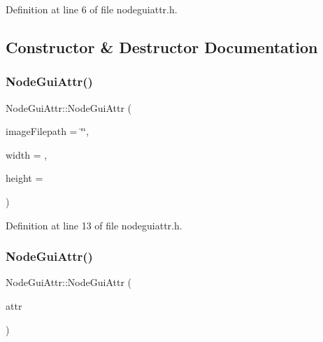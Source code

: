 Definition at line 6 of file nodeguiattr.\+h.



\subsection{Constructor \& Destructor Documentation}
\mbox{\label{struct_node_gui_attr_a97f0593ab84f42b7bd691d6715ccf20f}} 
\subsubsection{\texorpdfstring{Node\+Gui\+Attr()}{NodeGuiAttr()}\hspace{0.1cm}{\footnotesize\ttfamily [1/2]}}
{\footnotesize\ttfamily Node\+Gui\+Attr\+::\+Node\+Gui\+Attr (\begin{DoxyParamCaption}\item[{std\+::string}]{image\+Filepath = {\ttfamily \char`\"{}\char`\"{}},  }\item[{int}]{width = {},  }\item[{int}]{height = {} }\end{DoxyParamCaption})\hspace{0.3cm}{\ttfamily [inline]}}



Definition at line 13 of file nodeguiattr.\+h.

\mbox{\label{struct_node_gui_attr_abc15288865839636ce85c9e2a5c6dd68}} 
\subsubsection{\texorpdfstring{Node\+Gui\+Attr()}{NodeGuiAttr()}\hspace{0.1cm}{\footnotesize\ttfamily [2/2]}}
{\footnotesize\ttfamily Node\+Gui\+Attr\+::\+Node\+Gui\+Attr (\begin{DoxyParamCaption}\item[{const \mbox{\hyperlink{struct_node_gui_attr}{Node\+Gui\+Attr}} \&}]{attr }\end{DoxyParamCaption})\hspace{0.3cm}{\ttfamily [inline]}}



